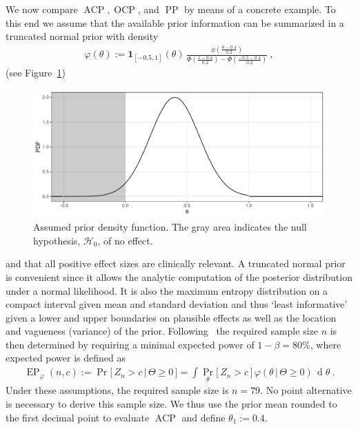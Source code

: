 \documentclass[12pt]{article}
\renewcommand{\Pr}{\operatorname{Pr}}
\newcommand{\ACP}{\ensuremath{\operatorname{ACP}}}
\newcommand{\OCP}{\ensuremath{\operatorname{OCP}}}
\newcommand{\PP}{\ensuremath{\operatorname{PP}}}
\newcommand{\EP}{\ensuremath{\operatorname{EP}}}
\renewcommand{\Pr}{\ensuremath{\operatorname{Pr}}}
\begin{document}
We now compare $\ACP, \OCP$, and $\PP$ by means of a concrete example.
To this end we assume that the available prior information can be summarized in a truncated normal prior with density
\begin{align}
    \varphi(\theta) := \boldsymbol{1}_{[-0.5, 1]}(\theta)\,\frac{\displaystyle \phi\left(\frac{\theta - 0.4}{0.2}\right)}{\displaystyle \Phi\left(\frac{1 - 0.4}{0.2}\right) - \Phi\left(\frac{-0.5 - 0.4}{0.2}\right)} \ ,
\end{align}
(see Figure~\ref{fig:prior-pdf})
\begin{figure}
    \centering
    \includegraphics[width=\textwidth]{figures/prior_density}
    \caption{%
        Assumed prior density function.
        The gray area indicates the null hypothesis, $\mathcal{H}_0$, of no effect.
    }
    \label{fig:prior-pdf}
\end{figure}
and that all positive effect sizes are clinically relevant.
A truncated normal prior is convenient since it allows the analytic
computation of the posterior distribution under a normal likelihood.
It is also the maximum entropy distribution on a compact interval given mean and standard deviation and thus `least informative'
given a lower and upper boundaries on plausible effects as well as
the location and vagueness (variance) of the prior.
Following~\cite{kunzmann2020} the required
sample size $n$ is then determined by requiring
a minimal expected power of $1-\beta=80\%$,
where expected power is defined as
\begin{align}
    \EP_\varphi(n, c) :=
    \Pr\big[\,Z_n>c\,|\,\Theta\geq0\,\big] = \int \Pr_\theta\big[\,Z_n>c\,\big]\, \varphi(\theta\,|\,\Theta\geq0) \,\operatorname{d}\theta \ .
\end{align}
Under these assumptions, the required sample size is
$n = 79$.
No point alternative is necessary to derive this sample size.
We thus use the prior mean rounded to the first decimal point to
evaluate $\ACP$ and define $\theta_1:=0.4$.
\end{document}
